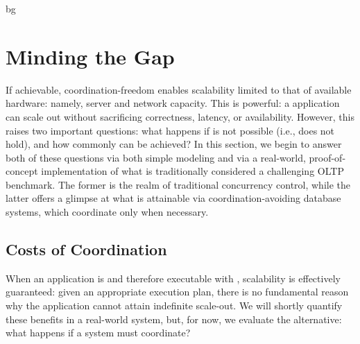 bg
\section{Minding the Gap}
\label{sec:evaluation}

If achievable, coordination-freedom enables scalability limited to
that of available hardware: namely, server and network capacity. This
is powerful: a \cfree application can scale out without sacrificing
correctness, latency, or availability. However, this raises two
important questions: what happens if \cfreedom is not possible (i.e.,
\iconfluence does not hold), and how commonly can \cfreedom be
achieved? In this section, we begin to answer both of these questions
via both simple modeling and via a real-world, proof-of-concept
implementation of what is traditionally considered a challenging OLTP
benchmark. The former is the realm of traditional concurrency control,
while the latter offers a glimpse at what is attainable via
coordination-avoiding database systems, which coordinate only when
necessary.

\subsection{Costs of Coordination}

When an application is \iconfluent and therefore executable with
\cfreedom, scalability is effectively guaranteed: given an appropriate
execution plan, there is no fundamental reason why the application
cannot attain indefinite scale-out. We will shortly quantify these
benefits in a real-world system, but, for now, we evaluate the
alternative: what happens if a system must coordinate?

